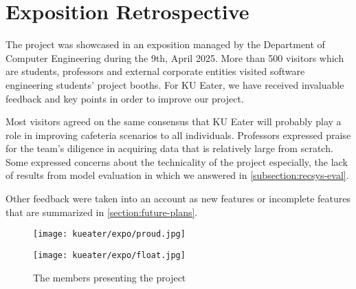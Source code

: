 \section{Exposition Retrospective}
\label{section:expo-retrospective}
The project was showcased in an exposition managed by the Department of Computer Engineering during the 9th, April 2025.
More than 500 visitors which are students, professors and external corporate entities visited software engineering students' project booths.
For KU Eater, we have received invaluable feedback and key points in order to improve our project.

Most visitors agreed on the same consensus that KU Eater will probably play a role in improving cafeteria scenarios to all individuals.
Professors expressed praise for the team's diligence in acquiring data that is relatively large from scratch. Some expressed concerns about
the technicality of the project especially, the lack of results from model evaluation in which we answered in \ref{subsection:recsys-eval}.

Other feedback were taken into an account as new features or incomplete features that are summarized in \ref{section:future-plans}.

\begin{figure}[h!]
    \begin{minipage}{.5\textwidth}
        \centering
        \texttt{[image: kueater/expo/proud.jpg]}
    \end{minipage}%
    \begin{minipage}{.5\textwidth}
        \centering
        \texttt{[image: kueater/expo/float.jpg]}
    \end{minipage}
    \caption{The members presenting the project}
    \vspace*{-\baselineskip}
\end{figure}


